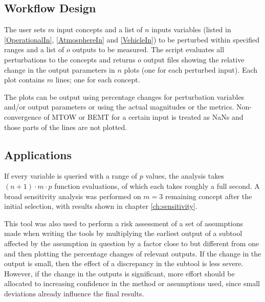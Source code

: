 \subsection{Workflow Design}

The user sets $m$ input concepts and a list of $n$ inputs variables (listed in \autoref{OperationalIn}, \autoref{AtmosphereIn} and \autoref{VehicleIn}) to be perturbed within specified ranges and a list of $o$ outputs to be measured. The script evaluates all perturbations to the concepts and returns $o$ output files showing the relative change in the output parameters in $n$ plots (one for each perturbed input). Each plot contains $m$ lines; one for each concept.

The plots can be output using percentage changes for perturbation variables and/or output parameters or using the actual magnitudes or the metrics. Non-convergence of MTOW or BEMT for a certain input is treated as NaNs and those parts of the lines are not plotted.


\subsection{Applications}

If every variable is queried with a range of $p$ values, the analysis takes $(n+1)\cdot m\cdot p$ function evaluations, of which each takes roughly a full second. A broad sensitivity analysis was performed on $m=3$ remaining concept after the initial selection, with results shown in chapter \ref{ch:sensitivity}.

This tool was also used to perform a risk assessment of a set of assumptions made when writing the tools by multiplying the earliest output of a subtool affected by the assumption in question by a factor close to but different from one and then plotting the percentage changes of relevant outputs. If the change in the output is small, then the effect of a discrepancy in the subtool is less severe. However, if the change in the outputs is significant, more effort should be allocated to increasing confidence in the method or assumptions used, since small deviations already influence the final results.





 